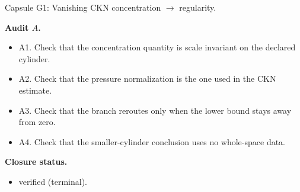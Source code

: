 \documentclass[11pt]{amsart}
\newcommand{\capsulefield}[1]{\par\smallskip\noindent\textbf{#1.}\ }
\begin{document}
\begin{proofcapsule}{Capsule G1: Vanishing CKN concentration $\to$ regularity.}
  \capsulefield{Audit \(A\)}
  \begin{itemize}[leftmargin=1.8em]
  \item A1. Check that the concentration quantity is scale invariant on the declared cylinder.
  \item A2. Check that the pressure normalization is the one used in the CKN estimate.
  \item A3. Check that the branch reroutes only when the lower bound stays away from zero.
  \item A4. Check that the smaller-cylinder conclusion uses no whole-space data.
  \end{itemize}
  \capsulefield{Closure status}
  \begin{itemize}[leftmargin=1.8em]
  \item verified (terminal).
  \end{itemize}
\end{proofcapsule}
\end{document}
